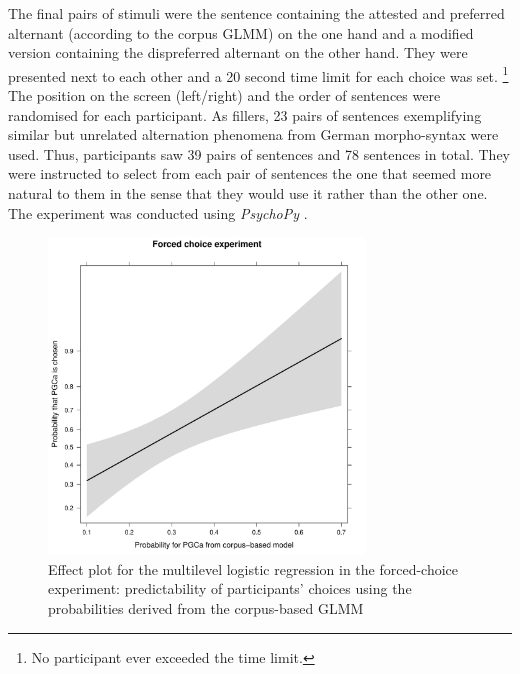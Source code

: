 \documentclass[USenglish]{article}
\begin{document}
The final pairs of stimuli were the sentence containing the attested and preferred alternant (according to the corpus GLMM) on the one hand and a modified version containing the dispreferred alternant on the other hand.
They were presented next to each other and a 20 second time limit for each choice was set.%
\footnote{No participant ever exceeded the time limit.}
The position on the screen (left\slash right) and the order of sentences were randomised for each participant.
As fillers, 23 pairs of sentences exemplifying similar but unrelated alternation phenomena from German morpho-syntax were used.
Thus, participants saw 39 pairs of sentences and 78 sentences in total.
They were instructed to select from each pair of sentences the one that seemed more natural to them in the sense that they would use it rather than the other one.
The experiment was conducted using \textit{PsychoPy} \citep{Peirce2007}.

\begin{figure}[hb!]
\centering
\includegraphics[width=0.75\textwidth]{../R/output/fc_effects}
\caption{Effect plot for the multilevel logistic regression in the forced-choice experiment: predictability of participants' choices using the probabilities derived from the corpus-based GLMM}
\label{fig:afc:effects}
\end{figure}
\end{document}
